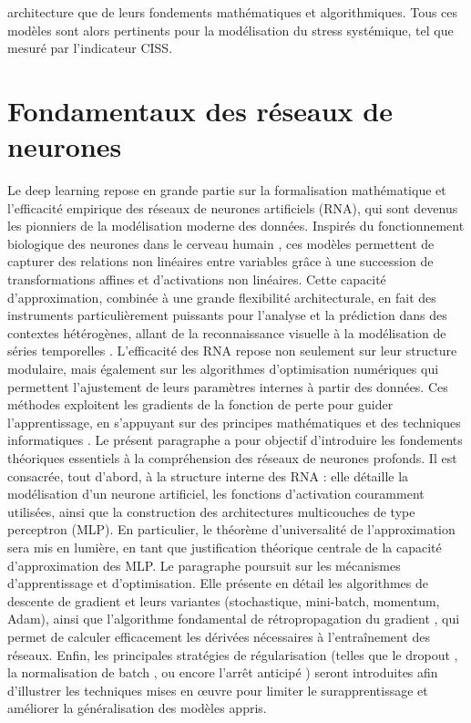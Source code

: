 architecture que de leurs fondements mathématiques et algorithmiques. Tous ces modèles sont alors pertinents pour la modélisation du stress systémique, tel que mesuré par l’indicateur CISS.

\section{Fondamentaux des réseaux de neurones}

Le deep learning repose en grande partie sur la formalisation mathématique et l'efficacité empirique des réseaux de neurones artificiels (RNA), qui sont devenus les pionniers de la modélisation moderne des données. Inspirés du fonctionnement biologique des neurones dans le cerveau humain \citep{mcculloch1943logical}, ces modèles permettent de capturer des relations non linéaires entre variables grâce à une succession de transformations affines et d’activations non linéaires. Cette capacité d’approximation, combinée à une grande flexibilité architecturale, en fait des instruments particulièrement puissants pour l’analyse et la prédiction dans des contextes hétérogènes, allant de la reconnaissance visuelle à la modélisation de séries temporelles \citep{lecun2015deep, schmidhuber2015deep}. L’efficacité des RNA repose non seulement sur leur structure modulaire, mais également sur les algorithmes d’optimisation numériques qui permettent l’ajustement de leurs paramètres internes à partir des données. Ces méthodes exploitent les gradients de la fonction de perte pour guider l’apprentissage, en s’appuyant sur des principes mathématiques et des techniques informatiques \citep{rumelhart1986learning, bottou2010large}. Le présent paragraphe a pour objectif d’introduire les fondements théoriques essentiels à la compréhension des réseaux de neurones profonds. Il est consacrée, tout d'abord, à la structure interne des RNA : elle détaille la modélisation d’un neurone artificiel, les fonctions d’activation couramment utilisées, ainsi que la construction des architectures multicouches de type perceptron (MLP). En particulier, le théorème d’universalité de l’approximation \citep{cybenko1989approximation, hornik1989multilayer} sera mis en lumière, en tant que justification théorique centrale de la capacité d’approximation des MLP. Le paragraphe poursuit sur les mécanismes d’apprentissage et d’optimisation. Elle présente en détail les algorithmes de descente de gradient et leurs variantes (stochastique, mini-batch, momentum, Adam), ainsi que l’algorithme fondamental de rétropropagation du gradient \citep{lecun1998gradient}, qui permet de calculer efficacement les dérivées nécessaires à l’entraînement des réseaux. Enfin, les principales stratégies de régularisation (telles que le dropout \citep{srivastava2014dropout}, la normalisation de batch \citep{ioffe2015batch}, ou encore l’arrêt anticipé \citep{prechelt1998early}) seront introduites afin d’illustrer les techniques mises en œuvre pour limiter le surapprentissage et améliorer la généralisation des modèles appris.

